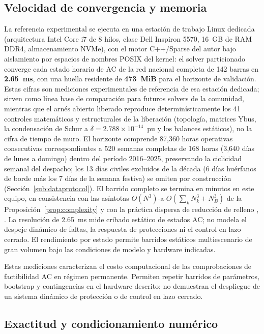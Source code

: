 \subsection{Velocidad de convergencia y memoria}
\label{sub:speed}

La referencia experimental se ejecuta en una estación de trabajo Linux dedicada (arquitectura Intel Core i7 de 8 hilos, clase Dell Inspiron 5570, 16~GB de RAM DDR4, almacenamiento NVMe), con el motor C++/Sparse del autor bajo aislamiento por espacios de nombres POSIX del kernel: el solver particionado converge cada estado horario de AC de la red nacional completa de 142 barras en \textbf{2.65~ms}, con una huella residente de \textbf{473~MiB} para el horizonte de validación. Estas cifras son mediciones experimentales de referencia de esa estación dedicada; sirven como línea base de comparación para futuros solvers de la comunidad, mientras que el arnés abierto liberado reproduce determinísticamente los 41 controles matemáticos y estructurales de la liberación (topología, matrices Ybus, la condensación de Schur a $\delta = 2.788 \times 10^{-14}$~pu y los balances estáticos), no la cifra de tiempo de muro. El horizonte comprende 87,360 horas operativas consecutivas correspondientes a 520 semanas completas de 168 horas (3,640 días de lunes a domingo) dentro del período 2016--2025, preservando la ciclicidad semanal del despacho; los 13 días civiles excluidos de la década (6 días huérfanos de borde más los 7 días de la semana festiva) se omiten por construcción (Sección~\ref{sub:dataprotocol}). El barrido completo se termina en minutos en este equipo, en consistencia con las asíntotas $O(N^3)$-a-$O(\sum_k N_k^3 + N_B^3)$ de la Proposición~\ref{prop:complexity} y con la práctica dispersa de reducción de relleno \cite{george1973}, \cite{saad2003}. La resolución de 2.65~ms mide cribado estático de estados AC; no modela el despeje dinámico de faltas, la respuesta de protecciones ni el control en lazo cerrado. El rendimiento por estado permite barridos estáticos multiescenario de gran volumen bajo las condiciones de modelo y hardware indicadas.

Estas mediciones caracterizan el costo computacional de las comprobaciones de factibilidad AC en régimen permanente. Permiten repetir barridos de parámetros, bootstrap y contingencias en el hardware descrito; no demuestran el despliegue de un sistema dinámico de protección o de control en lazo cerrado.

\subsection{Exactitud y condicionamiento numérico}
\label{sub:accuracy}

